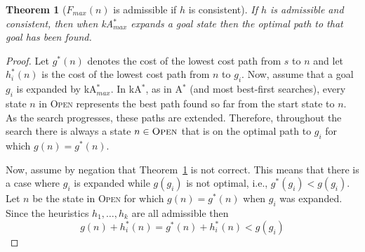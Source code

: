 \documentclass{aicom2e}
\newtheorem{theorem}{Theorem}
\newcommand{\astar}{A$^*$}
\newcommand{\kastar}{kA$^*$}
\newcommand{\kastarmax}{kA$^*_{max}$}
\newcommand{\maxf}{$F_{max}(n)$}
\newcommand{\open}{\textsc{Open}}
\newcommand{\roni}[1]{\textbf{[RS:#1]}}
\begin{document}


\begin{theorem}[\maxf{} is admissible if $h$ is consistent]
	If $h$ is admissible and consistent, then when 
	\kastarmax{} expands a goal state then the optimal path to that goal has been found. 
	\label{the:max-f}
\end{theorem}
\begin{proof}
	Let $g^*(n)$ denotes the cost of the lowest cost path from $s$ to $n$
	and let $h^*_i(n)$ is the cost of the lowest cost path from $n$ to $g_i$. 
	Now, assume that a goal $g_i$ is expanded by \kastarmax{}. 
	In \kastar{}, as in \astar{} (and most best-first searches), 
	every state $n$ in \open{} represents the best path found so far from the start state to $n$. 
	As the search progresses, these paths are extended. 
	Therefore, throughout the search there is always a state $n\in \open{}$ 
	that is on the optimal path to $g_i$ for which $g(n)=g^*(n)$. 
	
	Now, assume by negation that Theorem~\ref{the:max-f} is not correct. This means that
	there is a case where $g_i$ is expanded while $g(g_i)$ is not optimal, 
	i.e., $g^*(g_i)<g(g_i)$. Let $n$ be the state in \open{} for which $g(n)=g^*(n)$ 
	when $g_i$ was expanded. Since the heuristics $h_1,\ldots, h_k$ are all admissible
	then 
	\begin{equation}
	g(n)+h_i^*(n) = g^*(n)+h_i^*(n) < g(g_i)
	\label{eq:not-optimal}
	\end{equation}
	

\end{proof}
\end{document}
